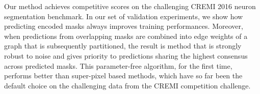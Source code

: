 Our method achieves competitive scores on the challenging CREMI 2016 neuron segmentation benchmark. In our set of validation experiments, we show how predicting encoded \maskname masks always improves training performances. Moreover, when predictions from overlapping masks are combined into edge weights of a graph that is subsequently partitioned, the result is method that is strongly robust to noise and gives priority to predictions sharing the highest consensus across predicted masks. 
This parameter-free algorithm, for the first time, performs better than super-pixel based methods, which have so far been the default choice on the challenging data from the CREMI competition challenge.









